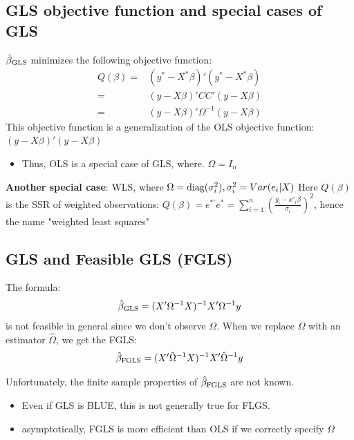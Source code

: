 \documentclass[a4paper,twoside,11pt]{article}
\begin{document}
\subsection{GLS objective function and special cases of GLS}
\begin{shaded*}
\noindent $\hat{\beta}_{\textmd{GLS}}$ minimizes the following objective function:
\begin{equation*}
\begin{aligned}
Q(\beta) =& (y^* - X^* \beta)' (y^* - X^* \beta) \\
=& (y- X\beta)' CC' (y- X\beta) \\
=& (y-X\beta)' \Omega^{-1} (y- X\beta)
\end{aligned} 
\end{equation*}
This objective function is a generalization of the OLS objective function: $(y-X\beta)' (y-X\beta)$
\begin{itemize}
    \item Thus, OLS is a special case of GLS, where. $\Omega = I_n$
\end{itemize}
\newline
\newline
\textbf{Another special case}: WLS, where $\Omega = \textmd{diag}(\sigma_i^2), \sigma^2_i = Var(e_i|X)$
\newline
Here $Q(\beta)$ is the SSR of weighted observations: $Q(\beta) = e^{*'} e^* = \sum^n_{i=1} (\frac{y_i - x'_i \beta}{\sigma_i})^2$, hence the name "weighted least squares"
\end{shaded*}
\subsection{GLS and Feasible GLS (FGLS)}
The formula:
\begin{equation*}
\begin{aligned}
\hat{\beta}_{\textmd{GLS}} = (X' \Omega^{-1} X)^{-1} X' \Omega^{-1} y
\end{aligned} 
\end{equation*}
is not feasible in general since we don't observe $\Omega$.
\newline
\newline
When we replace $\Omega$ with an estimator $\hat{\Omega}$, we get the FGLS:
\begin{equation*}
\begin{aligned}
\hat{\beta}_{\textmd{FGLS}} = (X' \hat{\Omega}^{-1} X)^{-1} X' \hat{\Omega}^{-1} y
\end{aligned} 
\end{equation*}
\textcolor{NavyBlue}{Unfortunately, the finite sample properties of $\hat{\beta}_{\textmd{FGLS}}$ are not known. 
\begin{itemize}
    \item Even if GLS is BLUE, this is not generally true for FLGS.
    \item asymptotically, FGLS is more efficient than OLS if we correctly specify $\Omega$
\end{itemize}}
\end{document}
